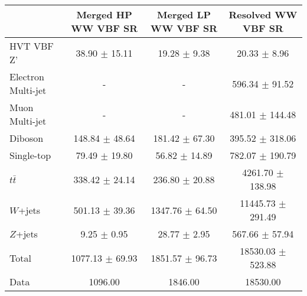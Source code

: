 \begin{tabular}{|l|c|c|c|}
\hline
	  &	Merged HP WW VBF SR &	Merged LP WW VBF SR &	Resolved WW VBF SR \\\hline 
	HVT VBF Z' &	38.90 $\pm$ 15.11 &	19.28 $\pm$ 9.38 &	20.33 $\pm$ 8.96 \\\hline 
	Electron Multi-jet &	- &	- &	596.34 $\pm$ 91.52 \\\hline 
	Muon Multi-jet &	- &	- &	481.01 $\pm$ 144.48 \\\hline 
	Diboson &	148.84 $\pm$ 48.64 &	181.42 $\pm$ 67.30 &	395.52 $\pm$ 318.06 \\\hline 
	Single-top &	79.49 $\pm$ 19.80 &	56.82 $\pm$ 14.89 &	782.07 $\pm$ 190.79 \\\hline 
	$t\bar{t}$ &	338.42 $\pm$ 24.14 &	236.80 $\pm$ 20.88 &	4261.70 $\pm$ 138.98 \\\hline 
	$W$+jets &	501.13 $\pm$ 39.36 &	1347.76 $\pm$ 64.50 &	11445.73 $\pm$ 291.49 \\\hline 
	$Z$+jets &	9.25 $\pm$ 0.95 &	28.77 $\pm$ 2.95 &	567.66 $\pm$ 57.94 \\\hline 
	Total &	1077.13 $\pm$ 69.93 &	1851.57 $\pm$ 96.73 &	18530.03 $\pm$ 523.88 \\\hline 
	Data &	1096.00 &	1846.00 &	18530.00 \\\hline 
\end{tabular}

